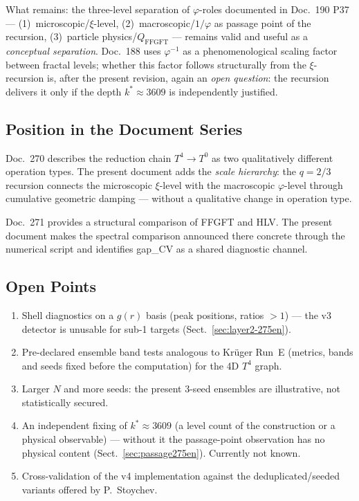 What remains: the three-level separation of $\varphi$-roles documented
in Doc.~190 P37 --- (1)~microscopic/$\xi$-level,
(2)~macroscopic/$1/\varphi$ as passage point of the recursion,
(3)~particle physics/$Q_\mathrm{FFGFT}$ --- remains valid and useful
as a \emph{conceptual separation}. Doc.~188 uses $\varphi^{-1}$ as a
phenomenological scaling factor between fractal levels; whether this
factor follows structurally from the $\xi$-recursion is, after the
present revision, again an \emph{open question}: the recursion
delivers it only if the depth $k^*\approx3609$ is independently
justified.

\subsection{Position in the Document Series}

Doc.~270 describes the reduction chain $T^4\to T^0$ as two qualitatively
different operation types. The present document adds the \emph{scale
hierarchy}: the $q=2/3$ recursion connects the microscopic $\xi$-level
with the macroscopic $\varphi$-level through cumulative geometric
damping --- without a qualitative change in operation type.

Doc.~271 provides a structural comparison of FFGFT and HLV. The present
document makes the spectral comparison announced there concrete through
the numerical script and identifies gap\_CV as a shared diagnostic channel.

\subsection{Open Points}

\begin{enumerate}
  \item Shell diagnostics on a $g(r)$ basis (peak positions, ratios
        $>1$) --- the v3 detector is unusable for sub-1 targets
        (Sect.~\ref{sec:layer2-275en}).
  \item Pre-declared ensemble band tests analogous to Krüger Run~E
        (metrics, bands and seeds fixed before the computation) for
        the 4D $T^4$ graph.
  \item Larger $N$ and more seeds: the present 3-seed ensembles are
        illustrative, not statistically secured.
  \item An independent fixing of $k^* \approx 3609$ (a level count of
        the construction or a physical observable) --- without it the
        passage-point observation has no physical content
        (Sect.~\ref{sec:passage275en}). Currently not known.
  \item Cross-validation of the v4 implementation against the
        deduplicated/seeded variants offered by P.~Stoychev.
\end{enumerate}

